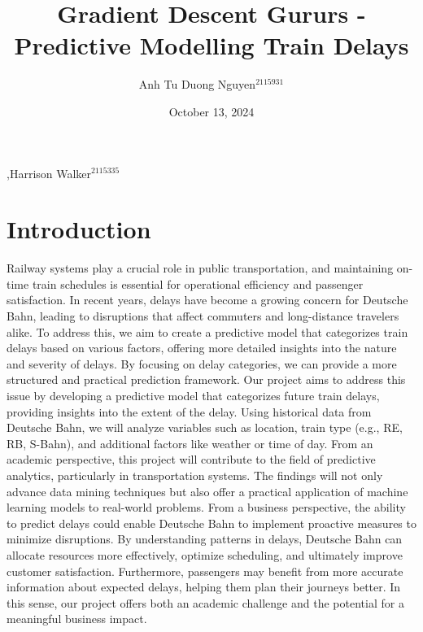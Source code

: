 \documentclass[a4paper,oneside,bibliography=totoc]{scrbook}
\begin{document}
\frontmatter \subject{Data Mining Project Outline HWS24} %
\title{Gradient Descent Gururs - Predictive Modelling Train Delays}
\author{Anh Tu Duong Nguyen$^{2115931}$},{Harrison Walker$^{2115335}$}
\date{October 13, 2024}
\publishers{{\small Submitted to}\\
Data and Web Science Group\\
Prof.\ Dr.\ Hertling\\
University of Mannheim\\}

\maketitle

\mainmatter
\chapter{Introduction}
\label{ch:intro}
Railway systems play a crucial role in public transportation, and maintaining on-time train schedules is essential for operational efficiency and passenger satisfaction. In recent years, delays have become a growing concern for Deutsche Bahn, leading to disruptions that affect commuters and long-distance travelers alike. To address this, we aim to create a predictive model that categorizes train delays based on various factors, offering more detailed insights into the nature and severity of delays. By focusing on delay categories, we can provide a more structured and practical prediction framework.
Our project aims to address this issue by developing a predictive model that categorizes future train delays, providing insights into the extent of the delay. Using historical data from Deutsche Bahn, we will analyze variables such as location, train type (e.g., RE, RB, S-Bahn), and additional factors like weather or time of day. From an academic perspective, this project will contribute to the field of predictive analytics, particularly in transportation systems. The findings will not only advance data mining techniques but also offer a practical application of machine learning models to real-world problems.
From a business perspective, the ability to predict delays could enable Deutsche Bahn to implement proactive measures to minimize disruptions. By understanding patterns in delays, Deutsche Bahn can allocate resources more effectively, optimize scheduling, and ultimately improve customer satisfaction. Furthermore, passengers may benefit from more accurate information about expected delays, helping them plan their journeys better. In this sense, our project offers both an academic challenge and the potential for a meaningful business impact.
\end{document}
